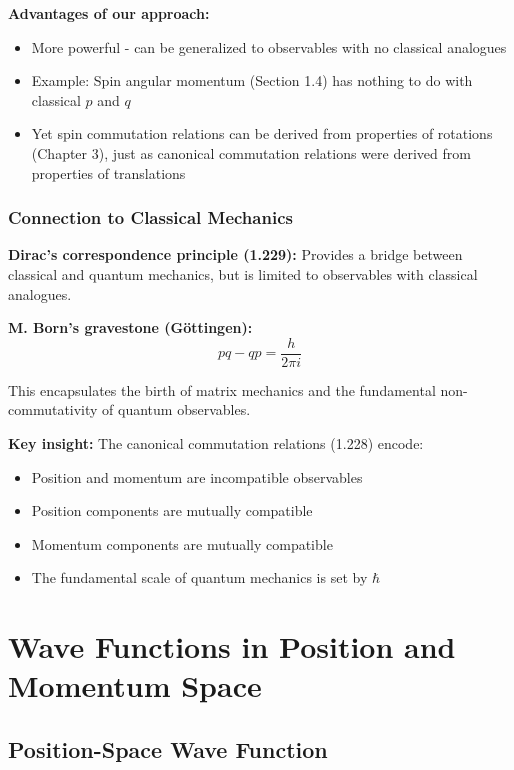 \documentclass[11pt,a4paper]{article}
\begin{document}
\textbf{Advantages of our approach:}
\begin{itemize}
\item More powerful - can be generalized to observables with no classical analogues
\item Example: Spin angular momentum (Section 1.4) has nothing to do with classical $p$ and $q$
\item Yet spin commutation relations can be derived from properties of rotations (Chapter 3), just as canonical commutation relations were derived from properties of translations
\end{itemize}

\subsubsection{Connection to Classical Mechanics}

\textbf{Dirac's correspondence principle (1.229):} Provides a bridge between classical and quantum mechanics, but is limited to observables with classical analogues.

\textbf{M. Born's gravestone (Göttingen):} 
$$pq - qp = \frac{h}{2\pi i}$$

This encapsulates the birth of matrix mechanics and the fundamental non-commutativity of quantum observables.

\textbf{Key insight:} The canonical commutation relations (1.228) encode:
\begin{itemize}
\item Position and momentum are incompatible observables
\item Position components are mutually compatible
\item Momentum components are mutually compatible
\item The fundamental scale of quantum mechanics is set by $\hbar$
\end{itemize}

\newpage
\section{Wave Functions in Position and Momentum Space}

\subsection{Position-Space Wave Function}
\end{document}
